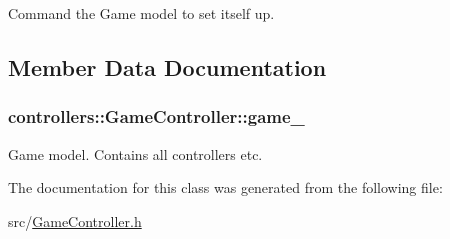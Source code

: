 \-Command the \-Game model to set itself up. 



\subsection{\-Member \-Data \-Documentation}
\hypertarget{classcontrollers_1_1GameController_a255cfc430fc9e7bd9e843068accc825b}{
\subsubsection[{game\-\_\-}]{ {\bf controllers\-::\-Game\-Controller\-::game\-\_\-}}}\label{d9/d54/classcontrollers_1_1GameController_a255cfc430fc9e7bd9e843068accc825b}


\-Game model. \-Contains all controllers etc. 



\-The documentation for this class was generated from the following file\-:\begin{DoxyCompactItemize}
\item 
src/\hyperlink{GameController_8h}{\-Game\-Controller.\-h}\end{DoxyCompactItemize}
